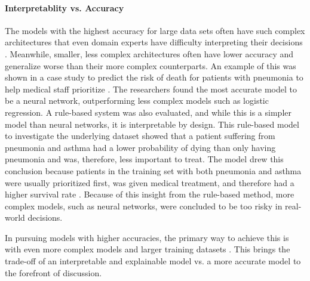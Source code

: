 \paragraph{Interpretablity vs. Accuracy\\}
The models with the highest accuracy for large data sets often have such complex architectures that even domain experts have difficulty interpreting their decisions \cite{caruanaIntelligibleModelsHealthCare2015}. Meanwhile, smaller, less complex architectures often have lower accuracy and generalize worse than their more complex counterparts. An example of this was shown in a case study to predict the risk of death for patients with pneumonia to help medical staff prioritize \cite{cooperPredictingDireOutcomes2005}. The researchers found the most accurate model to be a neural network, outperforming less complex models such as logistic regression. A rule-based system was also evaluated, and while this is a simpler model than neural networks, it is interpretable by design. This rule-based model to investigate the underlying dataset showed that a patient suffering from pneumonia and asthma had a lower probability of dying than only having pneumonia and was, therefore, less important to treat. The model drew this conclusion because patients in the training set with both pneumonia and asthma were usually prioritized first, was given medical treatment, and therefore had a higher survival rate \cite{cooperEvaluationMachinelearningMethods1997}. Because of this insight from the rule-based method, more complex models, such as neural networks, were concluded to be too risky in real-world decisions.

In pursuing models with higher accuracies, the primary way to achieve this is with even more complex models and larger training datasets \cite{bianchiniComplexityNeuralNetwork2014}. This brings the trade-off of an interpretable and explainable model vs. a more accurate model \cite{barredoarrietaExplainableArtificialIntelligence2020} to the forefront of discussion. 


